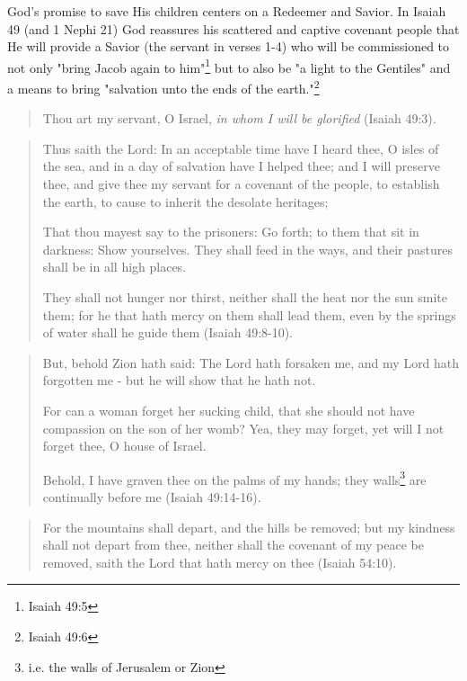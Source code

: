 God's promise to save His children centers on a Redeemer and Savior. In Isaiah 49 (and 1 Nephi 21) God reassures his scattered and captive covenant people that He will provide a Savior (the servant in verses 1-4) who will be commissioned to not only "bring Jacob again to him"\footnote{Isaiah 49:5} but to also be "a light to the Gentiles" and a means to bring "salvation unto the ends of the earth."\footnote{Isaiah 49:6}

\begin{quotation}
Thou art my servant, O Israel, \textit{in whom I will be glorified} (Isaiah 49:3).
\end{quotation}

\begin{quotation}
Thus saith the Lord: In an acceptable time have I heard thee, O isles of the sea, and in a day of salvation have I helped thee; and I will preserve thee, and give thee my servant for a covenant of the people, to establish the earth, to cause to inherit the desolate heritages;

That thou mayest say to the prisoners: Go forth; to them that sit in darkness: Show yourselves. They shall feed in the ways, and their pastures shall be in all high places.

They shall not hunger nor thirst, neither shall the heat nor the sun smite them; for he that hath mercy on them shall lead them, even by the springs of water shall he guide them (Isaiah 49:8-10).
\end{quotation}

\begin{quotation}
But, behold Zion hath said: The Lord hath forsaken me, and my Lord hath forgotten me - but he will show that he hath not.

For can a woman forget her sucking child, that she should not have compassion on the son of her womb? Yea, they may forget, yet will I not forget thee, O house of Israel.

Behold, I have graven thee on the palms of my hands; they walls\footnote{i.e. the walls of Jerusalem or Zion} are continually before me (Isaiah 49:14-16).
\end{quotation}

\begin{quotation}
For the mountains shall depart, and the hills be removed; but my kindness shall not depart from thee, neither shall the covenant of my peace be removed, saith the Lord that hath mercy on thee (Isaiah 54:10).
\end{quotation}

